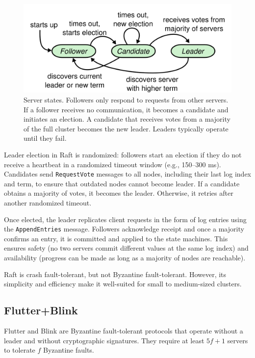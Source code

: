 \begin{figure}
    \centering
    \includegraphics[width=0.7\linewidth]{assets/raft-participants.png}
    \caption{Server states. Followers only respond to requests from other servers. If a follower receives no communication, it becomes a candidate and initiates an election. A candidate that receives votes from a majority of the full cluster becomes the new leader. Leaders typically operate until they fail.}
    \label{fig:raft-participants}
\end{figure}

Leader election in Raft is randomized: followers start an election if they do not receive a heartbeat in a randomized timeout window (e.g., 150--300 ms).  
Candidates send \texttt{RequestVote} messages to all nodes, including their last log index and term, to ensure that outdated nodes cannot become leader.  
If a candidate obtains a majority of votes, it becomes the leader. Otherwise, it retries after another randomized timeout.  

Once elected, the leader replicates client requests in the form of log entries using the \texttt{AppendEntries} message.  
Followers acknowledge receipt and once a majority confirms an entry, it is committed and applied to the state machines.  
This ensures safety (no two servers commit different values at the same log index) and availability (progress can be made as long as a majority of nodes are reachable).

Raft is crash fault-tolerant, but not Byzantine fault-tolerant. However, its simplicity and efficiency make it well-suited for small to medium-sized clusters.

\subsection{Flutter+Blink}

Flutter and Blink \cite{monti2024fast} are Byzantine fault-tolerant protocols that operate without a leader and without cryptographic signatures.  
They require at least $5f+1$ servers to tolerate $f$ Byzantine faults.  

